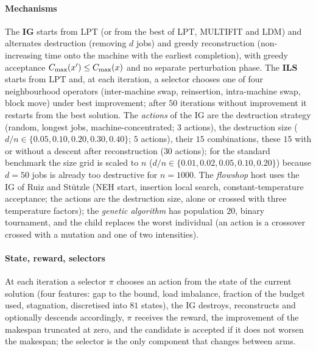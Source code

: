 \paragraph{Mechanisms} The \textbf{IG} starts from LPT (or from the best of LPT, MULTIFIT and LDM) and alternates destruction (removing $d$ jobs) and greedy reconstruction (non-increasing time onto the machine with the earliest completion), with greedy acceptance $C_{\max}(x')\le C_{\max}(x)$ and no separate perturbation phase. The \textbf{ILS} starts from LPT and, at each iteration, a selector chooses one of four neighbourhood operators (inter-machine swap, reinsertion, intra-machine swap, block move) under best improvement; after $50$ iterations without improvement it restarts from the best solution. The \emph{actions} of the IG are the destruction strategy (random, longest jobs, machine-concentrated; $3$ actions), the destruction size ($d/n\in\{0.05,0.10,0.20,0.30,0.40\}$; $5$ actions), their $15$ combinations, these $15$ with or without a descent after reconstruction ($30$ actions); for the standard benchmark the size grid is scaled to $n$ ($d/n\in\{0.01,0.02,0.05,0.10,0.20\}$) because $d=50$ jobs is already too destructive for $n=1000$. The \emph{flowshop} host uses the IG of Ruiz and St\"utzle (NEH start, insertion local search, constant-temperature acceptance; the actions are the destruction size, alone or crossed with three temperature factors); the \emph{genetic algorithm} has population $20$, binary tournament, and the child replaces the worst individual (an action is a crossover crossed with a mutation and one of two intensities).

\paragraph{State, reward, selectors} At each iteration a selector $\pi$ chooses an action from the state of the current solution (four features: gap to the bound, load imbalance, fraction of the budget used, stagnation, discretised into $81$ states), the IG destroys, reconstructs and optionally descends accordingly, $\pi$ receives the reward, the improvement of the makespan truncated at zero, and the candidate is accepted if it does not worsen the makespan; the selector is the only component that changes between arms.

